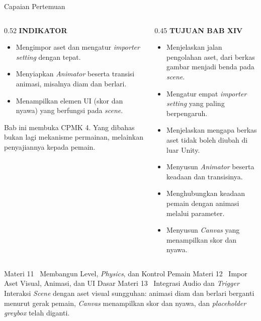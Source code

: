 \documentclass[aspectratio=169,10pt]{beamer}
\begin{document}
\begin{frame}{Capaian Pertemuan}
\begin{columns}[T,onlytextwidth]
\begin{column}{0.52\textwidth}
    {\fontsize{7}{8.5}\selectfont\bfseries\color{ubAccent}INDIKATOR}\par
    \vspace{0.06cm}
    \begin{itemize}
      \item Mengimpor aset dan mengatur \emph{importer setting} dengan tepat.
      \item Menyiapkan \emph{Animator} beserta transisi animasi, misalnya
            diam dan berlari.
      \item Menampilkan elemen UI (skor dan nyawa) yang berfungsi pada
            \emph{scene}.
    \end{itemize}
    \vspace{0.10cm}
    \begin{kotak}
      Bab ini membuka CPMK 4. Yang dibahas bukan lagi mekanisme permainan,
      melainkan penyajiannya kepada pemain.
    \end{kotak}
  \end{column}
  \begin{column}{0.45\textwidth}
    {\fontsize{7}{8.5}\selectfont\bfseries\color{ubAccent}TUJUAN BAB XIV}\par
    \vspace{0.08cm}
    \begin{itemize}
      \item Menjelaskan jalan pengolahan aset, dari berkas gambar menjadi
            benda pada \emph{scene}.
      \item Mengatur empat \emph{importer setting} yang paling berpengaruh.
      \item Menjelaskan mengapa berkas aset tidak boleh diubah di luar Unity.
      \item Menyusun \emph{Animator} beserta keadaan dan transisinya.
      \item Menghubungkan keadaan pemain dengan animasi melalui parameter.
      \item Menyusun \emph{Canvas} yang menampilkan skor dan nyawa.
    \end{itemize}
  \end{column}
\end{columns}
\end{frame}

  {Materi 11 \textperiodcentered\ Membangun Level, \emph{Physics}, dan Kontrol
   Pemain}
  {Materi 12 \textperiodcentered\ Impor Aset Visual, Animasi, dan UI Dasar}
  {Materi 13 \textperiodcentered\ Integrasi Audio dan \emph{Trigger} Interaksi}
  {\emph{Scene} dengan aset visual sungguhan: animasi diam dan berlari
   berganti menurut gerak pemain, \emph{Canvas} menampilkan skor dan nyawa,
   dan \emph{placeholder} \emph{greybox} telah diganti.}
\end{document}
